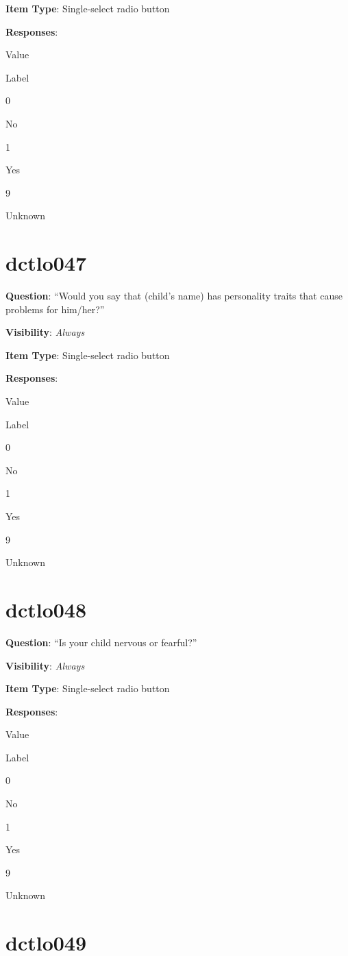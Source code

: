 \documentclass[]{book}
\begin{document}
\textbf{Item Type}: Single-select radio button

\textbf{Responses}:

Value

Label

0

No

1

Yes

9

Unknown

\hypertarget{dctlo047}{%
\section{dctlo047}\label{dctlo047}}

\textbf{Question}: ``Would you say that (child's name) has personality traits that cause problems for him/her?''

\textbf{Visibility}: \emph{Always}

\textbf{Item Type}: Single-select radio button

\textbf{Responses}:

Value

Label

0

No

1

Yes

9

Unknown

\hypertarget{dctlo048}{%
\section{dctlo048}\label{dctlo048}}

\textbf{Question}: ``Is your child nervous or fearful?''

\textbf{Visibility}: \emph{Always}

\textbf{Item Type}: Single-select radio button

\textbf{Responses}:

Value

Label

0

No

1

Yes

9

Unknown

\hypertarget{dctlo049}{%
\section{dctlo049}\label{dctlo049}}
\end{document}
